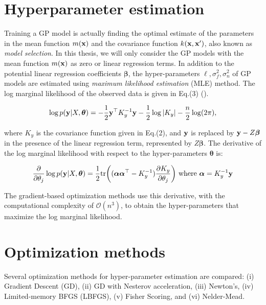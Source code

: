 \section{Hyperparameter estimation}

Training a GP model is actually finding the optimal estimate of the parameters in the mean function $m(\bold{x})$ and the covariance function $k(\bold{x},\bold{x}')$, also known as \textit{model selection}. In this thesis, we will only consider the GP models with the mean function $m(\bold{x})$ as zero or linear regression terms. In addition to the potential linear regression coefficients $\boldsymbol{\beta}$, the hyper-parameters $\ell, \sigma^2_f, \sigma^2_n$ of GP models are estimated using \textit{maximum likelihood estimation} (MLE) method. The log marginal likelihood of the observed data is given in Eq.(3) (\cite{williams2006gaussian}).

\begin{equation}
    \log p(\bold{y}|X, \boldsymbol{\theta}) = -\frac{1}{2}\bold{y}^\top K^{-1}_y \bold{y} - \frac{1}{2} \log |K_y| - \frac{n}{2}\log(2\pi),
\end{equation}

where $K_y$ is the covariance function given in Eq.(2), and $\bold{y}$ is replaced by $\bold{y}- Z \boldsymbol{\beta}$ in the presence of the linear regression term, represented by $Z \boldsymbol{\beta}$. The derivative of the log marginal likelihood with respect to the hyper-parameters $\boldsymbol{\theta}$ is:

\begin{equation}
    \frac{\partial}{\partial \theta_j} \log p(\bold{y}|X, \boldsymbol{\theta}) = \frac{1}{2} \text{tr}\bigg((\boldsymbol{\alpha} \boldsymbol{\alpha}^\top - K_y^{-1}) \frac{\partial K_y}{\partial \theta_j} \bigg) \ \text{where} \ \boldsymbol{\alpha} = K^{-1}_y\bold{y}
\end{equation}

The gradient-based optimization methods use this derivative, with the computational complexity of $\mathcal{O}(n^3)$, to obtain the hyper-parameters that maximize the log marginal likelihood.

\section{Optimization methods}
Several optimization methods for hyper-parameter estimation are compared: (i) Gradient Descent (GD), (ii) GD with Nesterov acceleration, (iii) Newton's, (iv) Limited-memory BFGS (LBFGS), (v) Fisher Scoring, and (vi) Nelder-Mead.

